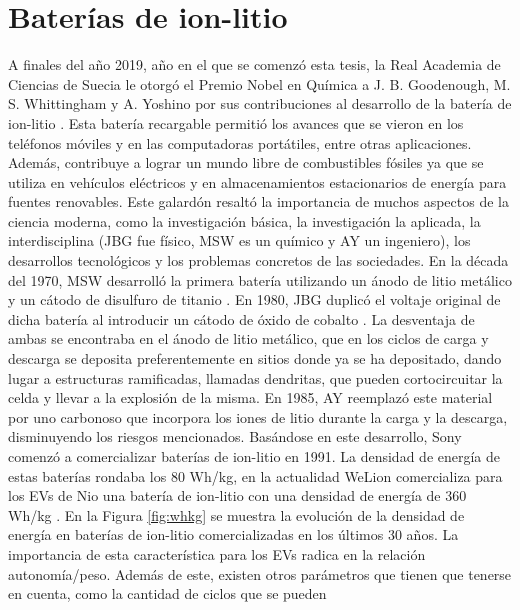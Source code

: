 \section{Baterías de ion-litio}

A finales del año 2019, año en el que se comenzó esta tesis, la Real Academia 
de Ciencias de Suecia le otorgó el Premio Nobel en Química a J. B. Goodenough, 
M. S. Whittingham y A. Yoshino por sus contribuciones al desarrollo de la batería 
de ion-litio \cite{nobel}. Esta batería recargable permitió los avances que se vieron en los 
teléfonos móviles y en las computadoras portátiles, entre otras aplicaciones.
Además, contribuye a lograr un mundo libre de combustibles fósiles ya que se utiliza en 
vehículos eléctricos y en almacenamientos estacionarios de energía para fuentes
renovables. Este galardón resaltó la importancia de muchos aspectos de la ciencia
moderna, como la investigación básica, la investigación la aplicada, la 
interdisciplina (JBG fue físico, MSW es un químico y AY un ingeniero), los 
desarrollos tecnológicos y los problemas concretos de las sociedades.
En la década del 1970, MSW desarrolló la primera batería utilizando un ánodo de
litio metálico y un cátodo de disulfuro de titanio \cite{whittingham1976}. En 
1980, JBG duplicó el voltaje original de dicha batería al introducir un cátodo 
de óxido de cobalto \cite{mizushima1980}.
La desventaja de ambas se encontraba en el ánodo de litio metálico, que en los 
ciclos de carga y descarga se deposita preferentemente en sitios donde ya se 
ha depositado, dando lugar a estructuras ramificadas, llamadas dendritas, que 
pueden cortocircuitar la celda y llevar a la explosión de la misma. En 1985,
AY reemplazó este material por uno carbonoso que incorpora los iones de litio
durante la carga y la descarga, disminuyendo los riesgos mencionados. Basándose
en este desarrollo, Sony comenzó a comercializar baterías de ion-litio en 1991.
La densidad de energía de estas baterías rondaba los 80 Wh/kg, en la actualidad
WeLion comercializa para los EVs de Nio una batería de ion-litio con una 
densidad de energía de 360 Wh/kg \cite{li2023700}. En la Figura \ref{fig:whkg} se muestra la 
evolución de la densidad de energía en baterías de ion-litio comercializadas 
en los últimos 30 años. La importancia de esta característica para los EVs 
radica en la relación autonomía/peso. Además de este, existen otros parámetros 
que tienen que tenerse en cuenta, como la cantidad de ciclos que se pueden 
